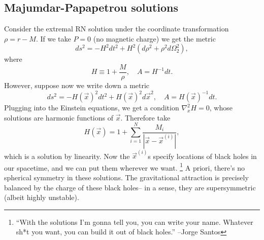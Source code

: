 \subsection*{Majumdar-Papapetrou solutions}
Consider the extremal RN solution under the coordinate transformation $\rho=r-M$. If we take $P=0$ (no magnetic charge) we get the metric
\begin{equation}
    ds^2 = -H^2 dt^2 +H^2 (d\rho^2 +\rho^2 d\Omega_2^2),
\end{equation}
where
\begin{equation}
    H\equiv 1+\frac{M}{\rho},\quad A= H^{-1}dt.
\end{equation}
However, suppose now we write down a metric
\begin{equation}
    ds^2 = -H(\vec x)^2 dt^2 + H(\vec x)^2 d\vec x^2,\quad A=H(\vec x)^{-1} dt.
\end{equation}
Plugging into the Einstein equations, we get a condition $\nabla_x^2 H=0$, whose solutions are harmonic functions of $\vec x$. Therefore take
\begin{equation}
    H(\vec x)= 1+ \sum_{i=1}^N \frac{M_i}{|\vec x - \vec x^{(i)}|},
\end{equation}
which is a solution by linearity. Now the $\vec x^{(i)}$s specify locations of black holes in our spacetime, and we can put them wherever we want.%
    \footnote{``With the solutions I'm gonna tell you, you can write your name. Whatever sh*t you want, you can build it out of black holes.'' --Jorge Santos}
A priori, there's no spherical symmetry in these solutions. The gravitational attraction is precisely balanced by the charge of these black holes-- in a sense, they are supersymmetric (albeit highly unstable).